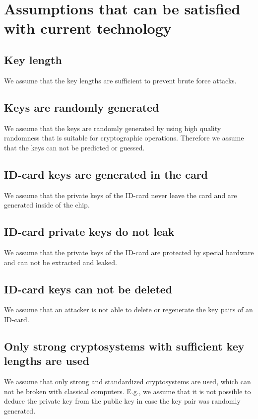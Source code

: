 \newpage
\section{Assumptions that can be satisfied with current technology} 
\label{sec:satisfiable_assumptions}
 
\subsection{Key length} 
We assume that the key lengths are sufficient to prevent brute force attacks.
 
\subsection{Keys are randomly generated} 
We assume that the keys are randomly generated by using high quality randomness that is suitable for cryptographic operations. Therefore  we assume that the keys can not be predicted or guessed. 

\subsection{ID-card keys are generated in the card} 
We assume that the private keys of the ID-card never leave the card and are generated inside of the chip.
 
\subsection{ID-card private keys do not leak}
We assume that the private keys of the ID-card are protected by special hardware and can not be extracted and leaked.

\subsection{ID-card keys can not be deleted} 
We assume that an attacker is not able to delete or regenerate the key pairs of an ID-card.

\subsection{Only strong cryptosystems with sufficient key lengths are used} 
We assume that only strong and standardized cryptosystems are used, which can not be broken with classical computers. E.g., we assume that it is not possible to deduce the private key from the public key in case the key pair was randomly generated.

